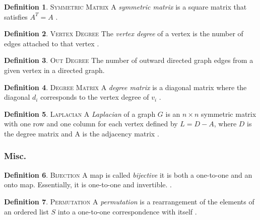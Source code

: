 \documentclass[11pt]{article}
\theoremstyle{definition}
\newtheorem{definition}{Definition}[section]
\begin{document}
	\theoremstyle{definition}
	\begin{definition}{\textsc{Symmetric Matrix}}
		A \emph{symmetric matrix} is a square matrix that satisfies $A^T = A$ \cite{mathworld:SymmetricMatrix}.
	\end{definition}
	
	\theoremstyle{definition}
	\begin{definition}{\textsc{Vertex Degree}}
		The \emph{vertex degree} of a vertex is the number of edges attached to that vertex \cite{mathworld:VertexDegree}.
	\end{definition}
	
	\theoremstyle{definition}
	\begin{definition}{\textsc{Out Degree}}
		The number of outward directed graph edges from a given vertex in a directed graph.
	\end{definition}
	
	\theoremstyle{definition}
	\begin{definition}{\textsc{Degree Matrix}}
		A \emph{degree matrix} is a diagonal matrix where the diagonal $d_i$ corresponds to the vertex degree of $v_i$ \cite{mathworld:DegreeMatrix}. 
	\end{definition}
	
	\theoremstyle{definition}
	\begin{definition}{\textsc{Laplacian}}
		A \emph{Laplacian} of a graph $G$ is an $n \times n$ symmetric matrix with one row and one column for each vertex defined by $L = D - A$, where $D$ is the degree matrix and A is the adjacency matrix \cite{mathworld:Laplacian}.
	\end{definition}

\subsubsection{Misc.}
	\theoremstyle{definition}
	\begin{definition}{\textsc{Bijection}}
		A map is called \emph{bijective} it is both a one-to-one and an onto map. 
		Essentially, it is one-to-one and invertible. \cite{mathworld:Bijection}. 
	\end{definition}
	
	\theoremstyle{definition}
	\begin{definition}{\textsc{Permutation}}
		 A \emph{permutation} is a rearrangement of the elements of an ordered list $S$ into a one-to-one correspondence with itself \cite{mathworld:Permutation}.
	\end{definition}
	
\end{document}
